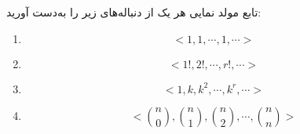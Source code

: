     \p 
تابع مولد نمایی هر یک از دنباله‌های زیر را به‌دست آورید:
\begin{enumerate}
\item
$$<1, 1, \cdots, 1, \cdots>$$
\item
$$<1!, 2!, \cdots, r!, \cdots>$$
\item
$$<1, k, k^2, \cdots, k^r, \cdots>$$
\item
$$<\binom{n}{0}, \binom{n}{1}, \binom{n}{2}, \cdots, \binom{n}{n}>$$
\end{enumerate}